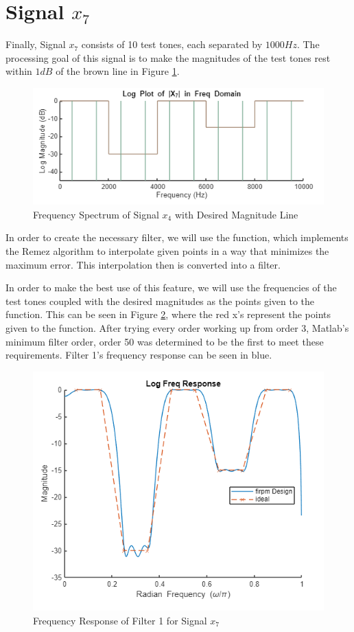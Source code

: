 
\section{Signal $x_7$}

Finally, Signal $x_7$ consists of 10 test tones, each separated by $1000 \unit{Hz}$.  The processing goal of this signal is to make the magnitudes of the test tones rest within $1 \unit{dB}$ of the brown line in Figure \ref{fig:X7}.

\begin{figure}[H]
    \centering
    \includegraphics[width=0.5\linewidth]{figures/X7_prefilter.png}
    \caption{Frequency Spectrum of Signal $x_4$ with Desired Magnitude Line}
    \label{fig:X7}
\end{figure}

In order to create the necessary filter, we will use the  function, which implements the Remez algorithm to interpolate given points in a way that minimizes the maximum error.  This interpolation then is converted into a filter.  

In order to make the best use of this feature, we will use the frequencies of the test tones coupled with the desired magnitudes as the points given to the  function.  This can be seen in Figure \ref{fig:x7_filterResponse}, where the red x's represent the points given to the  function.  After trying every order working up from order 3, Matlab's minimum filter order, order 50 was determined to be the first to meet these requirements.  Filter 1's frequency response can be seen in blue.

\begin{figure}[H]
    \centering
    \includegraphics[width=0.5\linewidth]{figures/x7_filterdesign.png}
    \caption{Frequency Response of Filter 1 for Signal $x_7$}
    \label{fig:x7_filterResponse}
\end{figure}

